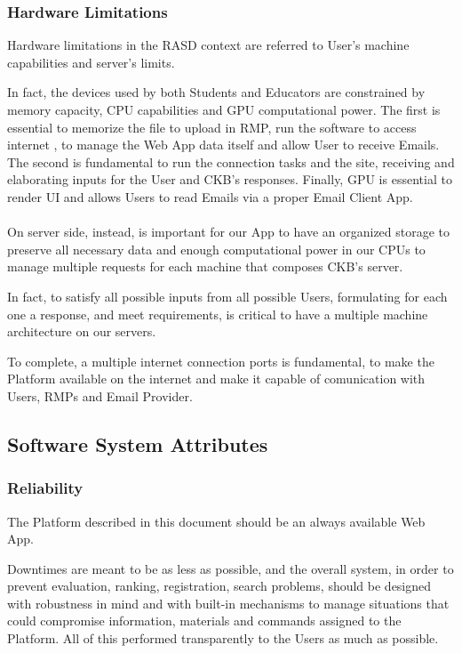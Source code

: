 \subsubsection{Hardware Limitations}
Hardware limitations in the RASD context are referred to User's machine capabilities and server's limits. 

In fact, the devices used by both Students and Educators are constrained by memory capacity, CPU capabilities and GPU computational power. The first is essential to memorize the file to upload in RMP, run the software to access internet
, to manage the Web App data itself and allow User to receive Emails. The second is fundamental to run the connection tasks and the site, receiving and elaborating inputs for the User and CKB's responses. Finally, GPU is essential to render UI and allows Users to read Emails via a proper Email Client App.\\
\\
 On server side, instead, is important for our App to have an organized storage to preserve all necessary data and enough computational power in our CPUs to manage multiple requests for each machine that composes CKB's server. 
 
In fact, to satisfy all possible inputs from all possible Users, formulating for each one a response, and meet requirements, is critical to have a multiple machine architecture on our servers. 

To complete, a multiple internet connection ports is fundamental, to make the Platform available on the internet and make it capable of comunication with Users, RMPs and Email Provider.

\subsection{Software System Attributes}

\subsubsection{Reliability}
The Platform described in this document should be an always available Web App. 

Downtimes are meant to be as less as possible, and the overall system, in order to prevent evaluation, ranking, registration, search problems, should be designed with robustness in mind and with built-in mechanisms to manage situations 
that could compromise information, materials and commands assigned to the Platform. All of this performed transparently to the Users as much as possible.


